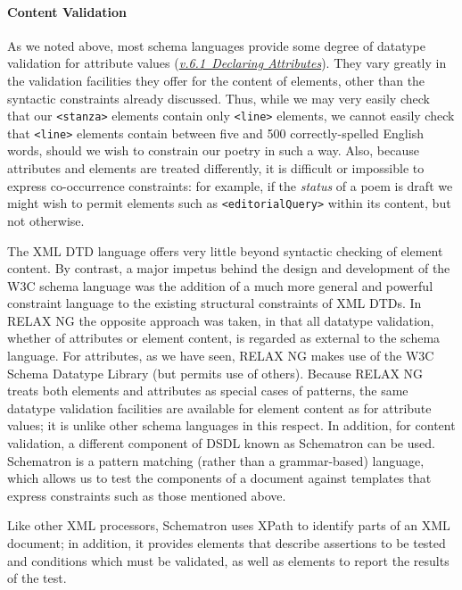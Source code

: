 \paragraph[{Content Validation}]{Content Validation}\label{SG-val}\par
As we noted above, most schema languages provide some degree of datatype validation for attribute values (\textit{\hyperref[SG-att]{v.6.1\ Declaring Attributes}}). They vary greatly in the validation facilities they offer for the content of elements, other than the syntactic constraints already discussed. Thus, while we may very easily check that our \texttt{<stanza>} elements contain only \texttt{<line>} elements, we cannot easily check that \texttt{<line>} elements contain between five and 500 correctly-spelled English words, should we wish to constrain our poetry in such a way. Also, because attributes and elements are treated differently, it is difficult or impossible to express co-occurrence constraints: for example, if the {\itshape status} of a poem is draft we might wish to permit elements such as \texttt{<editorialQuery>} within its content, but not otherwise.\par
The XML DTD language offers very little beyond syntactic checking of element content. By contrast, a major impetus behind the design and development of the W3C schema language was the addition of a much more general and powerful constraint language to the existing structural constraints of XML DTDs. In RELAX NG the opposite approach was taken, in that all datatype validation, whether of attributes or element content, is regarded as external to the schema language. For attributes, as we have seen, RELAX NG makes use of the W3C Schema Datatype Library (but permits use of others). Because RELAX NG treats both elements and attributes as special cases of patterns, the same datatype validation facilities are available for element content as for attribute values; it is unlike other schema languages in this respect. In addition, for content validation, a different component of DSDL known as Schematron can be used. Schematron is a pattern matching (rather than a grammar-based) language, which allows us to test the components of a document against templates that express constraints such as those mentioned above.\par
Like other XML processors, Schematron uses XPath to identify parts of an XML document; in addition, it provides elements that describe assertions to be tested and conditions which must be validated, as well as elements to report the results of the test. 